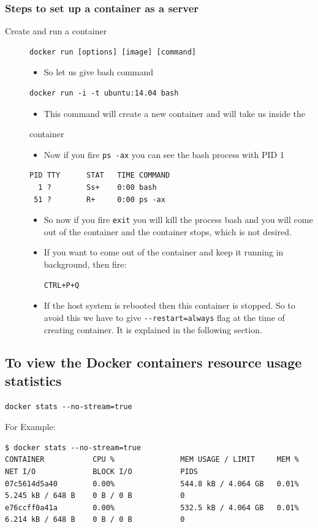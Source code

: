 \documentclass[11pt]{article}
\begin{document}
\subsubsection{Steps to set up a container as a server}
\label{sec:orgheadline24}
\begin{description}
\item[{Create and run a container}] \begin{verbatim}
docker run [options] [image] [command]
\end{verbatim}
\begin{itemize}
\item So let us give bash command
\end{itemize}
\begin{verbatim}
docker run -i -t ubuntu:14.04 bash
\end{verbatim}
\begin{itemize}
\item This command will create a new container and will take us inside the
\end{itemize}
container
\begin{itemize}
\item Now if you fire \texttt{ps -ax} you can see the bash process with PID 1
\end{itemize}
\begin{verbatim}
PID TTY      STAT   TIME COMMAND
  1 ?        Ss+    0:00 bash
 51 ?        R+     0:00 ps -ax
\end{verbatim}
\begin{itemize}
\item So now if you fire \texttt{exit} you will kill the process bash and you will come out of the container and the
container stops, which is not desired.
\item If you want to come out of the container and keep it running in background,
then fire:
\begin{verbatim}
CTRL+P+Q
\end{verbatim}
\item If the host system is rebooted then this container is stopped. So to avoid
this we have to give \texttt{-{}-restart=always} flag at the time of creating container. It is
explained in the following section.
\end{itemize}
\end{description}
\subsection{To view the Docker containers resource usage statistics}
\label{sec:orgheadline26}
\begin{verbatim}
docker stats --no-stream=true
\end{verbatim}
For Example:
\begin{verbatim}
$ docker stats --no-stream=true
CONTAINER           CPU %               MEM USAGE / LIMIT     MEM %               NET I/O             BLOCK I/O           PIDS
07c5614d5a40        0.00%               544.8 kB / 4.064 GB   0.01%               5.245 kB / 648 B    0 B / 0 B           0
e76ccff0a41a        0.00%               532.5 kB / 4.064 GB   0.01%               6.214 kB / 648 B    0 B / 0 B           0
\end{verbatim}
\end{document}
